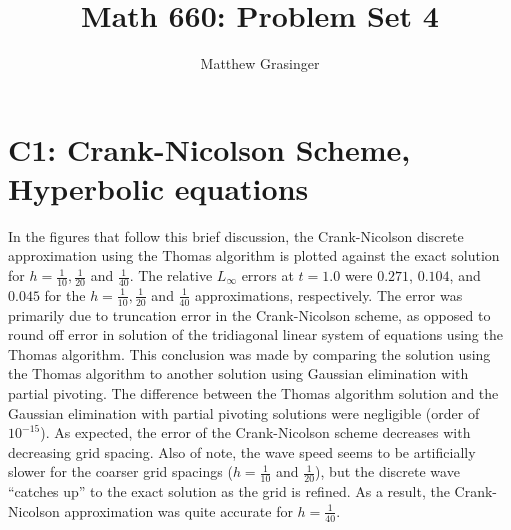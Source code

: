 \documentclass[a4paper,10pt]{article}
\title{Math 660: Problem Set 4}
\author{Matthew Grasinger}
\begin{document}
  \maketitle
  \tableofcontents

	\section{C1: Crank-Nicolson Scheme, Hyperbolic equations} \label{sec:c1}
	
	In the figures that follow this brief discussion, the Crank-Nicolson discrete approximation using the Thomas algorithm is plotted against the exact solution for $h = \frac{1}{10}, \frac{1}{20}$ and $\frac{1}{40}$.
	The relative $L_\infty$ errors at $t = 1.0$ were $0.271$, $0.104$, and $0.045$ for the $h = \frac{1}{10}, \frac{1}{20}$ and $\frac{1}{40}$ approximations, respectively.
	The error was primarily due to truncation error in the Crank-Nicolson scheme, as opposed to round off error in solution of the tridiagonal linear system of equations using the Thomas algorithm.
	This conclusion was made by comparing the solution using the Thomas algorithm to another solution using Gaussian elimination with partial pivoting.
	The difference between the Thomas algorithm solution and the Gaussian elimination with partial pivoting solutions were negligible (order of $10^{-15}$).
	As expected, the error of the Crank-Nicolson scheme decreases with decreasing grid spacing.
	Also of note, the wave speed seems to be artificially slower for the coarser grid spacings ($h = \frac{1}{10}$ and $\frac{1}{20}$), but the discrete wave ``catches up'' to the exact solution as the grid is refined.
	As a result, the Crank-Nicolson approximation was quite accurate for $h = \frac{1}{40}$.
\end{document}
